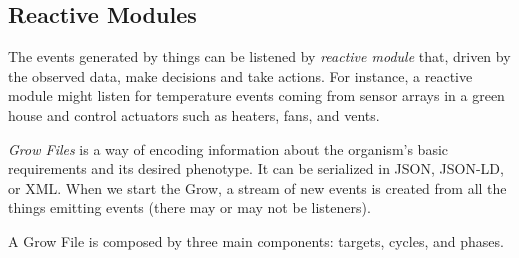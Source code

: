 

\subsection{Reactive Modules}

The events generated by things can be 
listened by \emph{reactive module} that,
driven by the observed data, make 
decisions and take actions.
For instance, a reactive module might listen for temperature events coming from sensor arrays in a green house and control actuators such as heaters, fans, and vents.

\emph{Grow Files} is a way of encoding information about the organism’s basic requirements and its desired phenotype. It can be serialized in JSON, JSON-LD, or XML. 
When we start the Grow, a stream of new events is created from all the things emitting events (there may or may not be listeners).


A Grow File is composed by three main components: targets, cycles, and phases.

